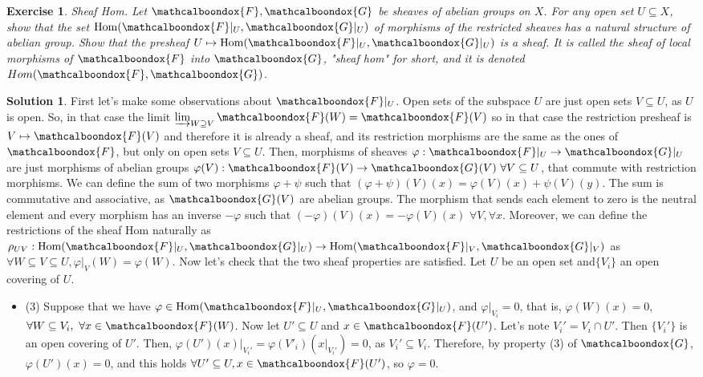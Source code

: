 \documentclass[12pt]{article}
\newtheorem{ex}{Exercise}[section]
\theoremstyle{definition}
\newtheorem*{sol}{Solution}
\newcommand{\sF}{\ensuremath{\mathcalboondox{F}}}
\newcommand{\sG}{\ensuremath{\mathcalboondox{G}}}
\begin{document}
\begin{ex}
	Sheaf Hom. Let $\sF, \sG$ be sheaves of abelian groups on $X$. For any open set $U \subseteq X$, show that the set $\mathrm{Hom}(\sF|_U, \sG|_U)$ of morphisms of the restricted sheaves has a natural structure of abelian group. Show that the presheaf $U \mapsto \mathrm{Hom}(\sF|_U, \sG|_U)$ is a sheaf. It is called the sheaf of local morphisms of $\sF$ into $\sG$, "sheaf hom" for short, and it is denoted $Hom(\sF, \sG)$.
\end{ex}

\begin{sol}
	First let's make some observations about $\sF|_U$. Open sets of the subspace $U$ are just open sets $V \subseteq U$, as $U$ is open. So, in that case the limit $\varinjlim_{W \supseteq V} \sF(W) = \sF(V)$ so in that case the restriction presheaf is $V \mapsto \sF(V)$ and therefore it is already a sheaf, and its restriction morphisms are the same as the ones of $\sF$, but only on open sets $V \subseteq U$. Then, morphisms of sheaves $\varphi: \sF|_U \to \sG|_U$ are just morphisms of abelian groups $\varphi(V): \sF(V) \to \sG(V) \, \, \forall V \subseteq U$, that commute with restriction morphisms. We can define the sum of two morphisms $\varphi + \psi$ such that $(\varphi + \psi)(V)(x) = \varphi(V)(x) + \psi(V)(y)$. The sum is commutative and associative, as $\sG(V)$ are abelian groups. The morphism that sends each element to zero is the neutral element and every morphism has an inverse $-\varphi$ such that $(-\varphi)(V)(x) = -\varphi(V)(x) \, \, \forall V, \forall x$. Moreover, we can define the restrictions of the sheaf Hom naturally as $\rho_{UV}: \mathrm{Hom}(\sF|_U, \sG|_U) \to \mathrm{Hom}(\sF|_V, \sG|_V)$ as $\forall W \subseteq V \subseteq U, \varphi|_V (W) = \varphi(W)$. Now let's check that the two sheaf properties are satisfied. Let $U$ be an open set and$\{V_i\}$ an open covering of $U$.
	\begin{itemize}
		\item (3) Suppose that we have $\varphi \in \mathrm{Hom}(\sF|_{U}, \sG|_U)$, and $\varphi|_{V_i} = 0$, that is, $\varphi(W)(x) = 0$, $\forall W \subseteq V_i, \, \, \forall x \in \sF(W)$. Now let $U' \subseteq U$ and $x \in \sF(U')$. Let's note $V_i' = V_i \cap U'$. Then $\{V_i'\}$ is an open covering of $U'$. Then, $\varphi(U')(x)|_{V_i'} = \varphi(V'_i)(x|_{V_i'}) = 0$, as $V_i' \subseteq V_i$. Therefore, by property (3) of $\sG$, $\varphi(U')(x) = 0$, and this holds $\forall U' \subseteq U, x \in \sF(U')$, so $\varphi = 0$.


\end{itemize}
\end{sol}
\end{document}

